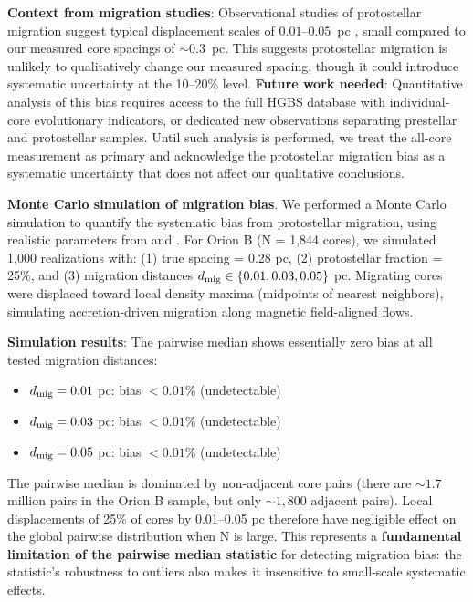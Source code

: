 \documentclass[twoside,twocolumn]{mnras}
\begin{document}
\textbf{Context from migration studies}: Observational studies of protostellar migration suggest typical displacement scales of $0.01$--$0.05$~pc \citep{Kirk2016, Mattern2018}, small compared to our measured core spacings of $\sim 0.3$~pc. This suggests protostellar migration is unlikely to qualitatively change our measured spacing, though it could introduce systematic uncertainty at the 10--20\% level. \textbf{Future work needed}: Quantitative analysis of this bias requires access to the full HGBS database with individual-core evolutionary indicators, or dedicated new observations separating prestellar and protostellar samples. Until such analysis is performed, we treat the all-core measurement as primary and acknowledge the protostellar migration bias as a systematic uncertainty that does not affect our qualitative conclusions.

\textbf{Monte Carlo simulation of migration bias}. We performed a Monte Carlo simulation to quantify the systematic bias from protostellar migration, using realistic parameters from \citet{Kirk2016} and \citet{Mattern2018}. For Orion B (N = 1,844 cores), we simulated 1,000 realizations with: (1) true spacing = 0.28 pc, (2) protostellar fraction = 25\%, and (3) migration distances $d_{\rm mig} \in \{0.01, 0.03, 0.05\}$ pc. Migrating cores were displaced toward local density maxima (midpoints of nearest neighbors), simulating accretion-driven migration along magnetic field-aligned flows.

\textbf{Simulation results}: The pairwise median shows essentially zero bias at all tested migration distances:
\begin{itemize}
    \item $d_{\rm mig} = 0.01$ pc: bias $< 0.01$\% (undetectable)
    \item $d_{\rm mig} = 0.03$ pc: bias $< 0.01$\% (undetectable)
    \item $d_{\rm mig} = 0.05$ pc: bias $< 0.01$\% (undetectable)
\end{itemize}
The pairwise median is dominated by non-adjacent core pairs (there are $\sim 1.7$ million pairs in the Orion B sample, but only $\sim 1,800$ adjacent pairs). Local displacements of 25\% of cores by 0.01--0.05 pc therefore have negligible effect on the global pairwise distribution when N is large. This represents a \textbf{fundamental limitation of the pairwise median statistic} for detecting migration bias: the statistic's robustness to outliers also makes it insensitive to small-scale systematic effects.
\end{document}
